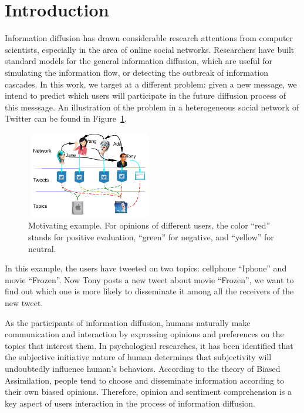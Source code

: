 \documentclass[letterpaper]{article}
\begin{document}
\section{Introduction}
\label{introduction}
\noindent Information diffusion has drawn considerable research attentions from computer scientists, especially in the area of online social networks. Researchers have built standard models for the general information diffusion,  which are useful for simulating the information flow\cite{goldenberg2001talk,kempe2003maximizing}, or detecting the outbreak of information cascades\cite{cheng2014can}. In this work, we target at a different problem: given a new message, we intend to predict which users will participate in the future diffusion process of this messsage\cite{Bian2014}. 
An illustration of the problem in a heterogeneous social network of Twitter can be found in Figure~\ref{fig00}. 
\begin{figure}[htb]
\centering
\includegraphics[width=2.2in,height=1.5in]{Mexample.pdf}
\caption{Motivating example. For opinions of different users, the color ``red'' stands for positive evaluation, ``green'' for negative, and ``yellow'' for neutral.}
\label{fig00}
\end{figure}
In this example, the users have tweeted on two topics: cellphone ``Iphone'' and movie ``Frozen''. Now Tony posts a new tweet about movie ``Frozen'', we want to find out which one is more likely to disseminate it among all the receivers of the new tweet.

As the participants of information diffusion, humans naturally make communication and interaction by expressing opinions and preferences on the topics that interest them. In psychological researches, it has been identified that the subjective initiative nature of human determines that subjectivity will undoubtedly influence human's behaviors\cite{moore2008awareness}. According to the theory of Biased Assimilation, people tend to choose and disseminate information according to their own biased opinions\cite{Hyman2000}. Therefore, opinion and sentiment comprehension is a key aspect of users interaction in the process of information diffusion. 
\end{document}
